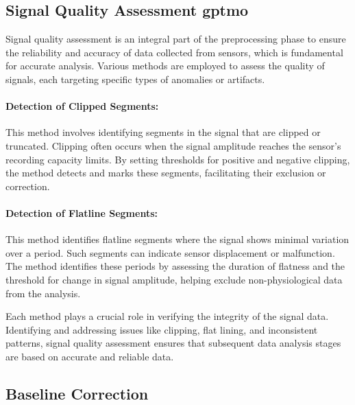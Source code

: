 \subsection*{Signal Quality Assessment \gls*{gptmo}}
\label{sec:signal_quality_assessment }

Signal quality assessment is an integral part of the preprocessing phase to ensure the reliability and accuracy of data collected from sensors, which is fundamental for accurate analysis. Various methods are employed to assess the quality of signals, each targeting specific types of anomalies or artifacts.

\paragraph{Detection of Clipped Segments:}
This method involves identifying segments in the signal that are clipped or truncated. Clipping often occurs when the signal amplitude reaches the sensor's recording capacity limits. By setting thresholds for positive and negative clipping, the method detects and marks these segments, facilitating their exclusion or correction.

\paragraph{Detection of Flatline Segments:}
This method identifies flatline segments where the signal shows minimal variation over a period. Such segments can indicate sensor displacement or malfunction. The method identifies these periods by assessing the duration of flatness and the threshold for change in signal amplitude, helping exclude non-physiological data from the analysis.


Each method plays a crucial role in verifying the integrity of the signal data. Identifying and addressing issues like clipping, flat lining, and inconsistent patterns, signal quality assessment ensures that subsequent data analysis stages are based on accurate and reliable data.



\subsection*{Baseline Correction}
\label{sec:baseline_correction}

